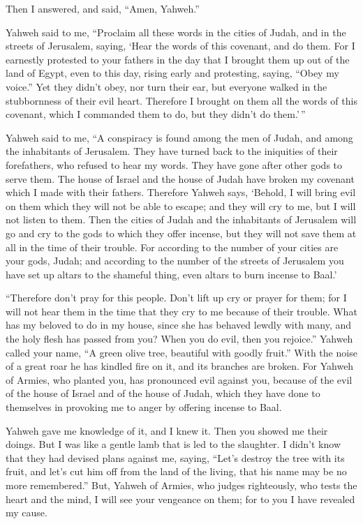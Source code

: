 Then I answered, and said, ``Amen, Yahweh.''

 Yahweh said to me, ``Proclaim all these words in the cities
of Judah, and in the streets of Jerusalem, saying, `Hear the words of
this covenant, and do them.  For I earnestly protested to
your fathers in the day that I brought them up out of the land of Egypt,
even to this day, rising early and protesting, saying, ``Obey my
voice.''  Yet they didn't obey, nor turn their ear, but
everyone walked in the stubbornness of their evil heart. Therefore I
brought on them all the words of this covenant, which I commanded them
to do, but they didn't do them.'\,''

 Yahweh said to me, ``A conspiracy is found among the men of
Judah, and among the inhabitants of Jerusalem.  They have
turned back to the iniquities of their forefathers, who refused to hear
my words. They have gone after other gods to serve them. The house of
Israel and the house of Judah have broken my covenant which I made with
their fathers.  Therefore Yahweh says, `Behold, I will
bring evil on them which they will not be able to escape; and they will
cry to me, but I will not listen to them.  Then the cities
of Judah and the inhabitants of Jerusalem will go and cry to the gods to
which they offer incense, but they will not save them at all in the time
of their trouble.  For according to the number of your
cities are your gods, Judah; and according to the number of the streets
of Jerusalem you have set up altars to the shameful thing, even altars
to burn incense to Baal.'

 ``Therefore don't pray for this people. Don't lift up cry
or prayer for them; for I will not hear them in the time that they cry
to me because of their trouble.  What has my beloved to do
in my house, since she has behaved lewdly with many, and the holy flesh
has passed from you? When you do evil, then you rejoice.'' 
Yahweh called your name, ``A green olive tree, beautiful with goodly
fruit.'' With the noise of a great roar he has kindled fire on it, and
its branches are broken.  For Yahweh of Armies, who planted
you, has pronounced evil against you, because of the evil of the house
of Israel and of the house of Judah, which they have done to themselves
in provoking me to anger by offering incense to Baal.

 Yahweh gave me knowledge of it, and I knew it. Then you
showed me their doings.  But I was like a gentle lamb that
is led to the slaughter. I didn't know that they had devised plans
against me, saying, ``Let's destroy the tree with its fruit, and let's
cut him off from the land of the living, that his name may be no more
remembered.''  But, Yahweh of Armies, who judges
righteously, who tests the heart and the mind, I will see your vengeance
on them; for to you I have revealed my cause.

